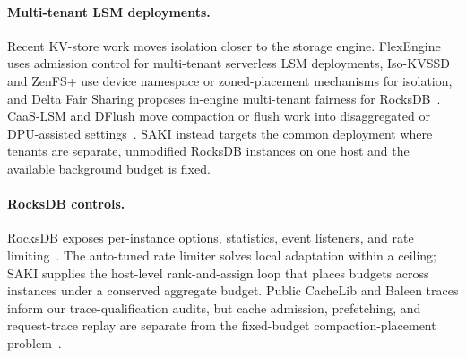 \paragraph{Multi-tenant LSM deployments.}
Recent KV-store work moves isolation closer to the storage engine. FlexEngine
uses admission control for multi-tenant serverless LSM deployments, Iso-KVSSD
and ZenFS+ use device namespace or zoned-placement mechanisms for isolation,
and Delta Fair Sharing proposes in-engine multi-tenant fairness for
RocksDB~\cite{wang2026flexengine,min2021isokvssd,oh2023zenfs,
griggs2026deltafairsharing}. CaaS-LSM and DFlush move compaction or flush work
into disaggregated or DPU-assisted settings~\cite{yu2024caaslsm,ding2025dflush}.
SAKI instead targets the common deployment where tenants are separate,
unmodified RocksDB instances on one host and the available background budget is
fixed.

\paragraph{RocksDB controls.}
RocksDB exposes per-instance options, statistics, event listeners, and rate
limiting~\cite{rocksdb,rocksdb_ratelimiter}. The auto-tuned rate limiter solves
local adaptation within a ceiling; SAKI supplies the host-level rank-and-assign
loop that places budgets across instances under a conserved aggregate budget.
Public CacheLib and Baleen traces inform our trace-qualification audits, but
cache admission, prefetching, and request-trace replay are separate from the
fixed-budget compaction-placement problem~\cite{cachelib_trace,baleen_fast24}.
